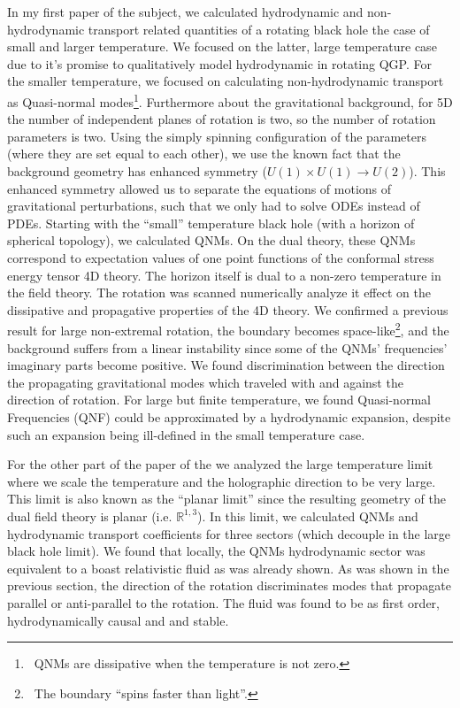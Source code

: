 \documentclass[12pt]{article}
\begin{document}
In my first paper of the subject, we calculated hydrodynamic and non-hydrodynamic transport related quantities of a rotating black hole the case of small and larger temperature.
%
We focused on the latter, large temperature case due to it's promise to qualitatively model hydrodynamic in rotating QGP.
%
For the smaller temperature, we focused on calculating non-hydrodynamic transport as Quasi-normal modes\footnote{\
  QNMs are dissipative when the temperature is not zero.
}.
%
Furthermore about the gravitational background, for 5D the number of independent planes of rotation is two, so the number of rotation parameters is two.
%
Using the simply spinning configuration of the parameters (where they are set equal to each other), we use the known fact that the background geometry has enhanced symmetry ($U(1)\times U(1) \rightarrow U(2)$).
%
This enhanced symmetry allowed us to separate the equations of motions of gravitational perturbations, such that we only had to solve ODEs instead of PDEs.
%
Starting with the ``small'' temperature black hole (with a horizon of spherical topology), we calculated QNMs.
%
On the dual theory, these QNMs correspond to expectation values of one point functions of the conformal stress energy tensor 4D theory.
%
The horizon itself is dual to a non-zero temperature in the field theory.
%
The rotation was scanned numerically analyze it effect on the dissipative and propagative properties of the 4D theory.
%
We confirmed a previous result for large non-extremal rotation, the boundary becomes space-like\footnote{\
  The boundary ``spins faster than light''.
}, and the background suffers from a linear instability since some of the QNMs' frequencies' imaginary parts become positive.
%
We found discrimination between the direction the propagating gravitational modes which traveled with and against the direction of rotation.
%
For large but finite temperature, we found Quasi-normal Frequencies (QNF) could be approximated by a hydrodynamic expansion, despite such an expansion being ill-defined in the small temperature case.

For the other part of the paper of the we analyzed the large temperature limit where we scale the temperature and the holographic direction to be very large.
%
This limit is also known as the ``planar limit'' since the resulting geometry of the dual field theory is planar (i.e. $\mathds{R}^{1,3}$). 
%
In this limit, we calculated QNMs and hydrodynamic transport coefficients for three sectors (which decouple in the large black hole limit).
%
We found that locally, the QNMs hydrodynamic sector was equivalent to a boast relativistic fluid as was already shown.
%
As was shown in the previous section, the direction of the rotation discriminates modes that propagate parallel or anti-parallel to the rotation.
%
The fluid was found to be as first order, hydrodynamically causal and and stable.
\end{document}
